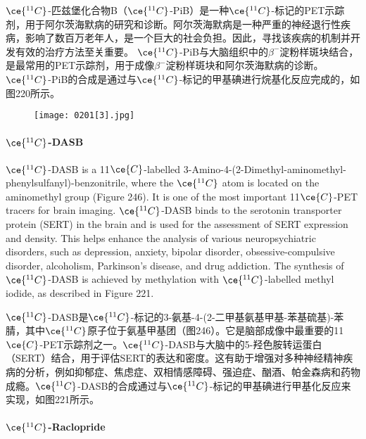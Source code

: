\documentclass[dvipsnames, svgnames,a4paper,11pt]{article}
\begin{document}
\(\ce{^{11}C}\)-匹兹堡化合物B（\(\ce{^{11}C}\)-PiB）是一种\(\ce{^{11}C}\)-标记的PET示踪剂，用于阿尔茨海默病的研究和诊断。阿尔茨海默病是一种严重的神经退行性疾病，影响了数百万老年人，是一个巨大的社会负担。因此，寻找该疾病的机制并开发有效的治疗方法至关重要。 \(\ce{^{11}C}\)-PiB与大脑组织中的$\beta^-$淀粉样斑块结合，是最常用的PET示踪剂，用于成像$\beta^-$淀粉样斑块和阿尔茨海默病的诊断。 \(\ce{^{11}C}\)-PiB的合成是通过与\(\ce{^{11}C}\)-标记的甲基碘进行烷基化反应完成的，如图220所示。

\begin{wrapfigure}{r}{0.35\textwidth}
    \centering
    \texttt{[image: 0201[3].jpg]}
     \label{fig246}
\end{wrapfigure}

\paragraph{\(\ce{^{11}C}\)-DASB}  
\(\ce{^{11}C}\)-DASB is a 11\(\ce{C}\)-labelled 3-Amino-4-(2-Dimethyl-aminomethyl-phenylsulfanyl)-benzonitrile, where the \(\ce{^{11}C}\) atom is located on the aminomethyl group (Figure 246). It is one of the most important 11\(\ce{C}\)-PET tracers for brain imaging. \(\ce{^{11}C}\)-DASB binds to the serotonin transporter protein (SERT) in the brain and is used for the assessment of SERT expression and density. This helps enhance the analysis of various neuropsychiatric disorders, such as depression, anxiety, bipolar disorder, obsessive-compulsive disorder, alcoholism, Parkinson's disease, and drug addiction. The synthesis of \(\ce{^{11}C}\)-DASB is achieved by methylation with \(\ce{^{11}C}\)-labelled methyl iodide, as described in Figure 221.

\(\ce{^{11}C}\)-DASB是\(\ce{^{11}C}\)-标记的3-氨基-4-(2-二甲基氨基甲基-苯基硫基)-苯腈，其中\(\ce{^{11}C}\)原子位于氨基甲基团（图246）。它是脑部成像中最重要的11\(\ce{C}\)-PET示踪剂之一。\(\ce{^{11}C}\)-DASB与大脑中的5-羟色胺转运蛋白（SERT）结合，用于评估SERT的表达和密度。这有助于增强对多种神经精神疾病的分析，例如抑郁症、焦虑症、双相情感障碍、强迫症、酗酒、帕金森病和药物成瘾。\(\ce{^{11}C}\)-DASB的合成通过与\(\ce{^{11}C}\)-标记的甲基碘进行甲基化反应来实现，如图221所示。

\paragraph{\(\ce{^{11}C}\)-Raclopride}  
\end{document}
